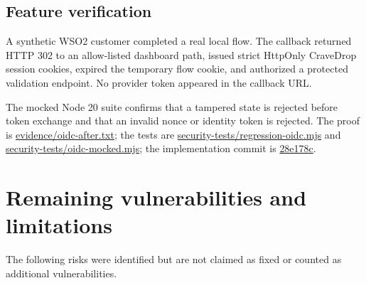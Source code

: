 \documentclass[11pt]{article}
\newcommand{\evidence}[1]{{\small\url{#1}}}
\begin{document}
\subsection{Feature verification}
A synthetic WSO2 customer completed a real local flow. The callback returned HTTP 302 to an allow-listed dashboard path, issued strict HttpOnly CraveDrop session cookies, expired the temporary flow cookie, and authorized a protected validation endpoint. No provider token appeared in the callback URL.

The mocked Node 20 suite confirms that a tampered state is rejected before token exchange and that an invalid nonce or identity token is rejected. The proof is \evidence{evidence/oidc-after.txt}; the tests are \evidence{security-tests/regression-oidc.mjs} and \evidence{security-tests/oidc-mocked.mjs}; the implementation commit is \evidence{28e178c}.

\section{Remaining vulnerabilities and limitations}\label{sec:remaining}
The following risks were identified but are not claimed as fixed or counted as additional vulnerabilities.
\end{document}

